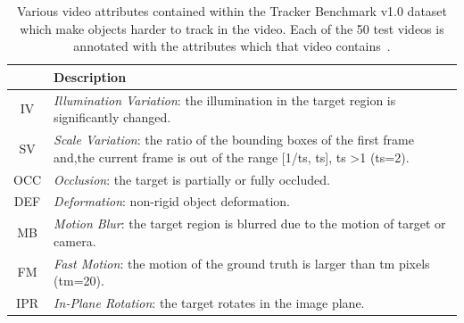 \documentclass{sig-alternate-05-2015}
\begin{document}
\begin{table}[]
\centering
\caption{Various video attributes contained within the Tracker Benchmark v1.0 dataset which make objects harder to track in the video. Each of the 50 test videos is annotated with the attributes which that video contains~\cite{wu2013online}.}
\label{tab:vid-attr}
\begin{tabular}{|
>{\columncolor[HTML]{C0C0C0}}c |p{6cm}|}
\hline
\multicolumn{1}{|l|}{\cellcolor[HTML]{C0C0C0}Video Attribute} & \cellcolor[HTML]{C0C0C0}Description                                                                                                                     \\ \hline
IV                                                            & \textit{Illumination Variation}: the illumination in the target region is significantly changed.                                                                 \\ \hline
SV                                                            & \textit{Scale Variation}: the ratio of the bounding boxes of the first frame and,the current frame is out of the range {[}1/ts, ts{]}, ts \textgreater 1 (ts=2). \\ \hline
OCC                                                           & \textit{Occlusion}: the target is partially or fully occluded.                                                                                                   \\ \hline
DEF                                                           & \textit{Deformation}: non-rigid object deformation.                                                                                                              \\ \hline
MB                                                            & \textit{Motion Blur}: the target region is blurred due to the motion of target or camera.                                                                        \\ \hline
FM                                                            & \textit{Fast Motion}: the motion of the ground truth is larger than tm pixels (tm=20).                                                                           \\ \hline
IPR                                                           & \textit{In-Plane Rotation}: the target rotates in the image plane.                                                                                               \\ \hline

\end{tabular}
\end{table}
\end{document}
